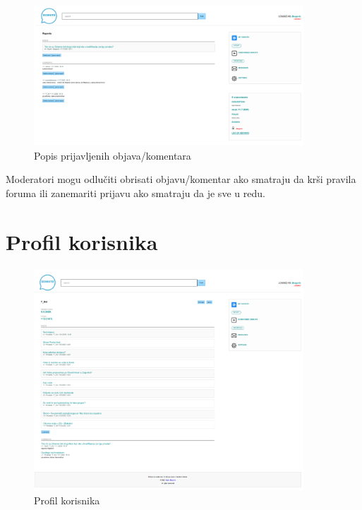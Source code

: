 \documentclass{foi}
\begin{document}
\begin{figure}[h!]
    \centering
    \includegraphics[width=0.9\textwidth]{slike/prijave.png}
    \caption{Popis prijavljenih objava/komentara}
\end{figure}

Moderatori mogu odlučiti obrisati objavu/komentar ako smatraju da krši pravila foruma ili zanemariti prijavu ako smatraju da je sve u redu.

\section{Profil korisnika}

\begin{figure}[h!]
    \centering
    \includegraphics[width=0.9\textwidth]{slike/profil.png}
    \caption{Profil korisnika}
\end{figure}
\end{document}
